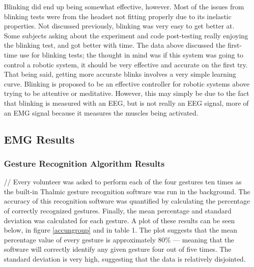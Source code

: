 \documentclass[journal]{IEEEtran}
\begin{document}
Blinking did end up being somewhat effective, however. Most of the issues from blinking tests were from the headset not fitting properly due to its inelastic properties. Not discussed previously, blinking was very easy to get better at. Some subjects asking about the experiment and code post-testing really enjoying the blinking test, and got better with time. The data above discussed the first-time use for blinking tests; the thought in mind was if this system was going to control a robotic system, it should be very effective and accurate on the first try. That being said, getting more accurate blinks involves a very simple learning curve. Blinking is proposed to be an effective controller for robotic systems above trying to be attentive or meditative. However, this may simply be due to the fact that blinking is measured with an EEG, but is not really an EEG signal, more of an EMG signal because it measures the muscles being activated. \par

\newpage
\subsection{EMG Results}
\subsubsection{Gesture Recognition Algorithm Results} //
Every volunteer was asked to perform each of the four gestures ten times as the built-in Thalmic gesture recognition software was run in the background. The accuracy of this recognition software was quantified by calculating the percentage of correctly recognized gestures. Finally, the mean percentage and standard deviation was calculated for each gesture. A plot of these results can be seen below, in figure \ref{accungroup} and in table 1. The plot suggests that the mean percentage value of every gesture is approximately $80\%$ --- meaning that the software will correctly identify any given gesture four out of five times. The standard deviation is very high, suggesting that the data is relatively disjointed.

\begin{table}[h]
\end{table}
    
\end{document}
